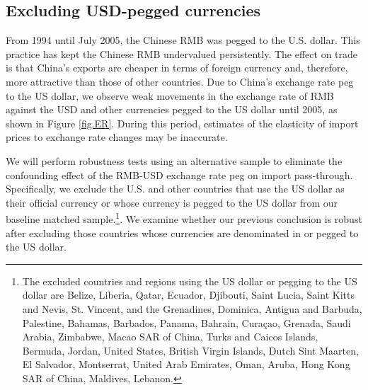 \subsection{Excluding USD-pegged currencies}

From 1994 until July 2005, the Chinese RMB was pegged to the U.S. dollar. This practice has kept the Chinese RMB undervalued persistently. The effect on trade is that China's exports are cheaper in terms of foreign currency and, therefore, more attractive than those of other countries. Due to China's exchange rate peg to the US dollar, we observe weak movements in the exchange rate of RMB against the USD and other currencies pegged to the US dollar until 2005, as shown in Figure \ref{fig.ER}. During this period, estimates of the elasticity of import prices to exchange rate changes may be inaccurate.

We will perform robustness tests using an alternative sample to eliminate the confounding effect of the RMB-USD exchange rate peg on import pass-through. Specifically, we exclude the U.S. and other countries that use the US dollar as their official currency or whose currency is pegged to the US dollar from our baseline matched sample.\footnote{The excluded countries and regions using the US dollar or pegging to the US dollar are Belize, Liberia, Qatar, Ecuador, Djibouti, Saint Lucia, Saint Kitts and Nevis, St. Vincent, and the Grenadines, Dominica, Antigua and Barbuda, Palestine, Bahamas, Barbados, Panama, Bahrain, Curaçao, Grenada, Saudi Arabia, Zimbabwe, Macao SAR of China, Turks and Caicos Islands, Bermuda, Jordan, United States, British Virgin Islands, Dutch Sint Maarten, El Salvador, Montserrat, United Arab Emirates, Oman, Aruba, Hong Kong SAR of China, Maldives, Lebanon.}. We examine whether our previous conclusion is robust after excluding those countries whose currencies are denominated in or pegged to the US dollar.

